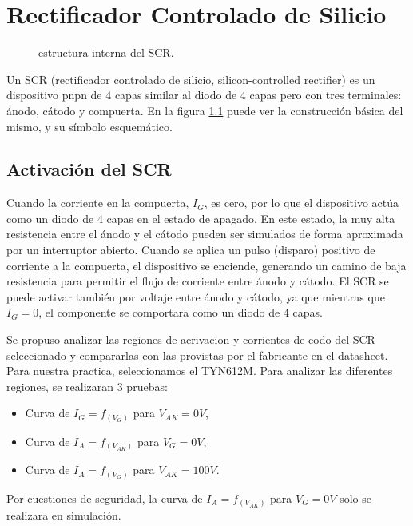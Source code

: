 \chapter{Rectificador Controlado de Silicio}
  \begin{figure}
  \vspace{-1cm}
    \centering
    \resizebox{!}{\linewidth}{
    
    }
    \caption{estructura interna del SCR.}
    \label{fig:scr_si}
  \end{figure}
  Un SCR (rectificador controlado de silicio, silicon-controlled rectifier) es un dispositivo pnpn de 4 capas similar al
  diodo de 4 capas pero con tres terminales: ánodo, cátodo y compuerta. En la figura \ref{fig:scr_si} puede ver la
  construcción básica del mismo, y su símbolo esquemático.

  \section{Activación del SCR}
    Cuando la corriente en la compuerta, $I_G$, es cero, por lo que el dispositivo actúa como un diodo de 4 capas en el
    estado de apagado. En este estado, la muy alta resistencia entre el ánodo y el cátodo pueden ser simulados de forma
    aproximada por un interruptor abierto. Cuando se aplica un pulso (disparo) positivo de corriente a la compuerta, el
    dispositivo se enciende, generando un camino de baja resistencia para permitir el flujo de corriente entre ánodo y
    cátodo. El SCR se puede activar también por voltaje entre ánodo y cátodo, ya que mientras que $I_G = 0$, el componente
    se comportara como un diodo de 4 capas.

    Se propuso analizar las regiones de acrivacion y corrientes de codo del SCR seleccionado y compararlas con las
    provistas por el fabricante en el datasheet. Para nuestra practica, seleccionamos el TYN612M. Para analizar las
    diferentes regiones, se realizaran 3 pruebas:
    \begin{itemize}
      \item Curva de $I_G = f_{(V_G)}$ para $V_{AK} = 0V$,
      \item Curva de $I_A = f_{(V_{AK})}$ para $V_G = 0V$,
      \item Curva de $I_A = f_{(V_G)}$ para $V_{AK} = 100V$.
    \end{itemize}

    Por cuestiones de seguridad, la curva de $I_A = f_{(V_{AK})}$ para $V_G = 0V$ solo se realizara en simulación.

